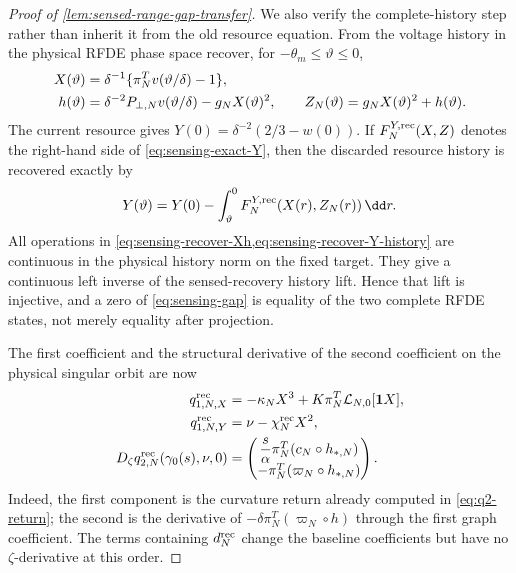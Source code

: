 \begin{proof}[Proof of \cref{lem:sensed-range-gap-transfer}]
We also verify the complete-history step rather than inherit it from the old
resource equation.  From the voltage history in the physical RFDE phase
space recover, for \(-\theta_m\le\vartheta\le0\),
\begin{align}
 X(\vartheta)
 &=\delta^{-1}\{\pi_N^Tv(\vartheta/\delta)-1\},\notag\\
 h(\vartheta)
 &=\delta^{-2}P_{\perp,N}v(\vartheta/\delta)
      -g_NX(\vartheta)^2,
 \qquad Z_N(\vartheta)=g_NX(\vartheta)^2+h(\vartheta). \label{eq:sensing-recover-Xh}
\end{align}
The current resource gives \(Y(0)=\delta^{-2}(2/3-w(0))\).  If
\(F_N^{Y,{\rm rec}}(X,Z)\) denotes the right-hand side of
\cref{eq:sensing-exact-Y}, then the discarded resource history is recovered
exactly by
\begin{equation}
 Y(\vartheta)=Y(0)-\int_\vartheta^0
   F_N^{Y,{\rm rec}}(X(r),Z_N(r))\,\dd r.             \label{eq:sensing-recover-Y-history}
\end{equation}
All operations in \cref{eq:sensing-recover-Xh,eq:sensing-recover-Y-history}
are continuous in the physical history norm on the fixed target.  They give
a continuous left inverse of the sensed-recovery history lift.  Hence that
lift is injective, and a zero of \cref{eq:sensing-gap} is equality of the
two complete RFDE states, not merely equality after projection.

The first coefficient and the structural derivative of the second
coefficient on the physical singular orbit are now
\begin{align}
 q^{\rm rec}_{1,N,X}
 &=-\kappa_NX^3+K\pi_N^T\mathcal L_{N,0}[\mathbf1X],\notag\\
 q^{\rm rec}_{1,N,Y}
 &=\nu-\chi_N^{\rm rec}X^2,                          \label{eq:sensing-q1}\\
 D_\zeta q^{\rm rec}_{2,N}(\gamma_0(s),\nu,0)
 &=\begin{pmatrix}
  \dfrac{s}{\alpha}\pi_N^T(c_N\circ h_{*,N})\\[1mm]
  -\pi_N^T(\varpi_N\circ h_{*,N})
 \end{pmatrix}.                                      \label{eq:sensing-q2-return}
\end{align}
Indeed, the first component is the curvature return already computed in
\cref{eq:q2-return}; the second is the derivative of
\(-\delta\pi_N^T(\varpi_N\circ h)\) through the first graph coefficient.
The terms containing \(d_N^{\rm rec}\) change the baseline coefficients but
have no \(\zeta\)-derivative at this order.


\end{proof}
